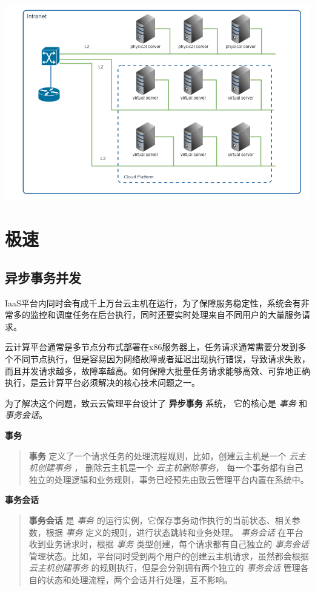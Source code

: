 \documentclass[letterpaper,10pt]{sphinxmanual}
\begin{document}
\includegraphics{1_4_virtualization_plus.png}


\chapter{极速}
\label{index:id8}

\section{异步事务并发}
\label{index:id9}
IaaS平台内同时会有成千上万台云主机在运行，为了保障服务稳定性，系统会有非常多的监控和调度任务在后台执行，同时还要实时处理来自不同用户的大量服务请求。

云计算平台通常是多节点分布式部署在x86服务器上，任务请求通常需要分发到多个不同节点执行，但是容易因为网络故障或者延迟出现执行错误，导致请求失败，而且并发请求越多，故障率越高。如何保障大批量任务请求能够高效、可靠地正确执行，是云计算平台必须解决的核心技术问题之一。

为了解决这个问题，致云云管理平台设计了 \textbf{异步事务} 系统， 它的核心是 \emph{事务} 和 \emph{事务会话}。

\textbf{事务}
\begin{quote}

\textbf{事务} 定义了一个请求任务的处理流程规则，比如，创建云主机是一个 \emph{云主机创建事务} ， 删除云主机是一个 \emph{云主机删除事务}， 每一个事务都有自己独立的处理逻辑和业务规则，事务已经预先由致云管理平台内置在系统中。
\end{quote}

\textbf{事务会话}
\begin{quote}

\textbf{事务会话} 是 \emph{事务} 的运行实例，它保存事务动作执行的当前状态、相关参数，根据 \emph{事务} 定义的规则，进行状态跳转和业务处理。 \emph{事务会话} 在平台收到业务请求时，根据 \emph{事务} 类型创建，每个请求都有自己独立的 \emph{事务会话} 管理状态。比如，平台同时受到两个用户的创建云主机请求，虽然都会根据 \emph{云主机创建事务} 的规则执行，但是会分别拥有两个独立的 \emph{事务会话} 管理各自的状态和处理流程，两个会话并行处理，互不影响。
\end{quote}
\end{document}

